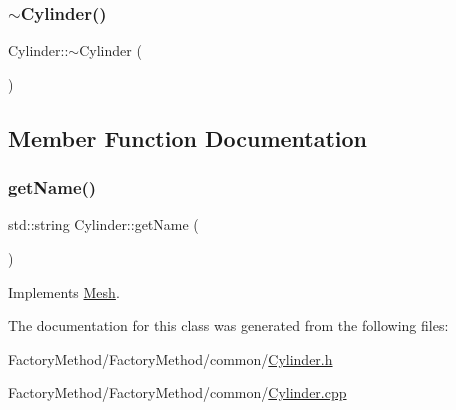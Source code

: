 \mbox{\label{class_cylinder_a05ab556f0ae3cd6e99d9d1f3caca80b3}} 
\subsubsection{\texorpdfstring{$\sim$Cylinder()}{~Cylinder()}}
{\footnotesize\ttfamily Cylinder\+::$\sim$\+Cylinder (\begin{DoxyParamCaption}{ }\end{DoxyParamCaption})}



\subsection{Member Function Documentation}
\mbox{\label{class_cylinder_afdb7f76b3f02471d638c36127395d181}} 
\subsubsection{\texorpdfstring{getName()}{getName()}}
{\footnotesize\ttfamily std\+::string Cylinder\+::get\+Name (\begin{DoxyParamCaption}{ }\end{DoxyParamCaption})\hspace{0.3cm}{\ttfamily [virtual]}}



Implements \mbox{\hyperlink{class_mesh_aa131fe1c2586fe60988155db77c57272}{Mesh}}.



The documentation for this class was generated from the following files\+:\begin{DoxyCompactItemize}
\item 
Factory\+Method/\+Factory\+Method/common/\mbox{\hyperlink{_cylinder_8h}{Cylinder.\+h}}\item 
Factory\+Method/\+Factory\+Method/common/\mbox{\hyperlink{_cylinder_8cpp}{Cylinder.\+cpp}}\end{DoxyCompactItemize}

